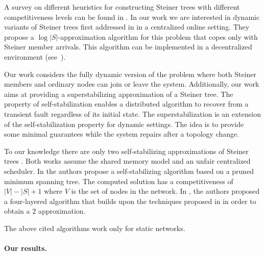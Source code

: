 \documentclass[11pt]{article}
\begin{document}
A survey on different heuristics for constructing Steiner trees with different competitiveness levels can be found
in \cite{thesis96,Steiner_survey}.
In our work we are interested in dynamic variants of Steiner trees
first addressed in \cite{ImaseWaxman91} in a centralized online setting.
They propose a $\log |S|$-approximation algorithm for this problem that copes
only with Steiner member arrivals. This algorithm can be 
implemented in a decentralized environment (see~\cite{GataniRG05}).

Our work considers the fully dynamic version
of the problem where both Steiner members and ordinary nodes can join
or leave the system.
Additionally, our work aims at providing a 
superstabilizing approximation of a Steiner tree. 
The property of self-stabilization  \cite{Dij74,Dol00} enables a distributed
algorithm to recover from a transient fault regardless of its initial
state. The superstabilization \cite{Dolev_SuperStab} is an extension of the
self-stabilization property for dynamic settings. The idea is to
provide some minimal guarantees while the system repairs after a 
topology change.

To our knowledge there are only two self-stabilizing approximations of
Steiner trees
\cite{SS_Steiner02,Kakugawa_Steiner_journal}. Both works assume the 
shared memory model and an unfair centralized scheduler.
In \cite{SS_Steiner02} the authors propose a self-stabilizing
algorithm based on a pruned minimum spanning 
tree. 
The computed solution has a competitiveness of
$|V|-|S|+1$ where $V$ is the set of nodes in the network. 
In \cite{Kakugawa_Steiner_journal}, the authors proposed a
four-layered algorithm that builds upon the techniques 
proposed in \cite{WuWW86} in order to obtain a $2$ approximation. 



The above cited algorithms work only for static networks. 


\paragraph{Our results.}
\end{document}
